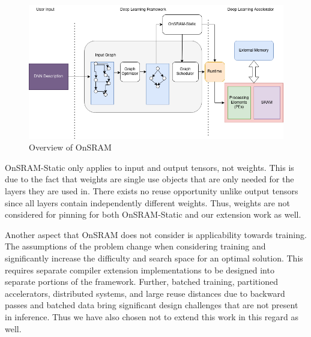\begin{figure}[thb]
\centering
\includegraphics[scale=0.5]{Figures/onsram_stack.png}
\decoRule
\caption[Overview of OnSRAM]{Overview of OnSRAM}
\label{fig:onsram_stack}
\end{figure}


OnSRAM-Static only applies to input and output tensors, not weights. This is
due to the fact that weights are single use objects that are only needed for
the layers they are used in. There exists no reuse opportunity unlike output
tensors since all layers contain independently different weights. Thus, weights
are not considered for pinning for both OnSRAM-Static and our extension work as
well.

Another aspect that OnSRAM does not consider is applicability towards training.
The assumptions of the problem change when considering training and
significantly increase the difficulty and search space for an optimal solution.
This requires separate compiler extension implementations to be designed into
separate portions of the framework. Further, batched training, partitioned
accelerators, distributed systems, and large reuse distances due to backward
passes and batched data \cite{onsram} bring significant design challenges that
are not present in inference. Thus we have also chosen not to extend this work
in this regard as well.



